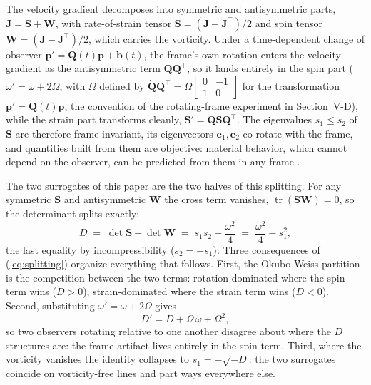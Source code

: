 \documentclass[lettersize,journal]{IEEEtran}
\begin{document}
The velocity gradient decomposes into symmetric and antisymmetric
parts, $\mathbf{J} = \mathbf{S} + \mathbf{W}$, with rate-of-strain
tensor $\mathbf{S} = (\mathbf{J} + \mathbf{J}^\top)/2$ and spin tensor
$\mathbf{W} = (\mathbf{J} - \mathbf{J}^\top)/2$, which carries the
vorticity. Under a time-dependent change of observer $\mathbf{p}' =
\mathbf{Q}(t)\mathbf{p} + \mathbf{b}(t)$, the frame's own rotation
enters the velocity gradient as the antisymmetric term
$\dot{\mathbf{Q}}\mathbf{Q}^\top$, so it lands entirely in the spin
part ($\omega' = \omega + 2\Omega$, with $\Omega$ defined by
$\dot{\mathbf{Q}}\mathbf{Q}^\top = \Omega\left[\begin{smallmatrix} 0 &
-1 \\ 1 & 0 \end{smallmatrix}\right]$ for the transformation
$\mathbf{p}' = \mathbf{Q}(t)\mathbf{p}$, the convention of the
rotating-frame experiment in Section~\mbox{V-D}), while the strain part
transforms cleanly, $\mathbf{S}' =
\mathbf{Q}\mathbf{S}\mathbf{Q}^\top$. The eigenvalues $s_1 \leq s_2$ of
$\mathbf{S}$ are therefore frame-invariant, its eigenvectors
$\mathbf{e}_1, \mathbf{e}_2$ co-rotate with the frame, and quantities
built from them are objective: material behavior, which cannot depend
on the observer, can be predicted from them in any frame \cite{16,17}.

The two surrogates of this paper are the two halves of this splitting.
For any symmetric $\mathbf{S}$ and antisymmetric $\mathbf{W}$ the cross
term vanishes, $\operatorname{tr}(\mathbf{S}\mathbf{W}) = 0$, so the
determinant splits exactly:
\begin{equation}
    D \;=\; \det\mathbf{S} + \det\mathbf{W}
      \;=\; s_1 s_2 + \frac{\omega^2}{4}
      \;=\; \frac{\omega^2}{4} - s_1^2,
    \label{eq:splitting}
\end{equation}
the last equality by incompressibility ($s_2 = -s_1$). Three
consequences of (\ref{eq:splitting}) organize everything that follows.
First, the Okubo-Weiss partition is the competition between the two
terms: rotation-dominated where the spin term wins ($D > 0$),
strain-dominated where the strain term wins ($D < 0$). Second,
substituting $\omega' = \omega + 2\Omega$ gives
\begin{equation}
    D' = D + \Omega\,\omega + \Omega^2,
    \label{eq:D_not_objective}
\end{equation}
so two observers rotating relative to one another disagree about where
the $D$ structures are: the frame artifact lives entirely in the spin
term. Third, where the vorticity vanishes the identity collapses to
$s_1 = -\sqrt{-D}$: the two surrogates coincide on vorticity-free
lines and part ways everywhere else.
\end{document}
